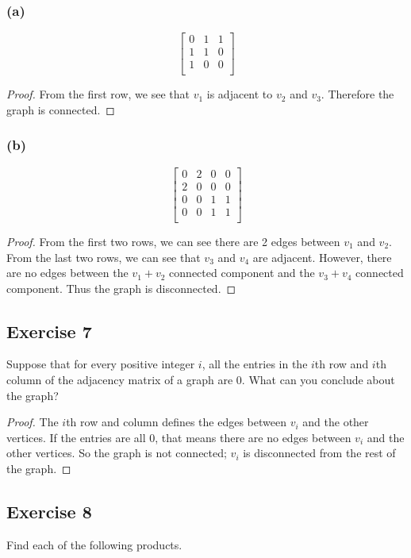 \documentclass[14pt]{extarticle}
\begin{document}
\subsubsection{(a)}
\[
\left[ 
\begin{array}{ccc}
0 & 1 & 1 \\
1 & 1 & 0 \\
1 & 0 & 0 \\
\end{array}
\right]
\]
\begin{proof}
From the first row, we see that \(v_1\) is adjacent to \(v_2\) and \(v_3\). Therefore the graph is connected.
\end{proof}

\subsubsection{(b)}
\[
\left[ 
\begin{array}{cccc}
0 & 2 & 0 & 0 \\
2 & 0 & 0 & 0 \\
0 & 0 & 1 & 1 \\
0 & 0 & 1 & 1 \\
\end{array}
\right]
\]
\begin{proof}
From the first two rows, we can see there are 2 edges between \(v_1\) and \(v_2\). From the last two rows, we can see that
\(v_3\) and \(v_4\) are adjacent. However, there are no edges between the \(v_1+v_2\) connected component and the 
\(v_3+v_4\) connected component. Thus the graph is disconnected.
\end{proof}

\subsection{Exercise 7}
Suppose that for every positive integer \(i\), all the entries in the \(i\)th row and \(i\)th column of the adjacency matrix 
of a graph are 0. What can you conclude about the graph?

\begin{proof}
The \(i\)th row and column defines the edges between \(v_i\) and the other vertices. If the entries are all 0, that means
there are no edges between \(v_i\) and the other vertices. So the graph is not connected; \(v_i\) is disconnected from the
rest of the graph.
\end{proof}

\subsection{Exercise 8}
Find each of the following products.
\end{document}
